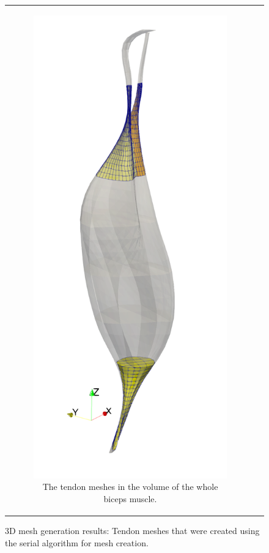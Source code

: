 \begin{figure}
\begin{tabular}{cc}
\begin{subfigure}[b]{0.30\textwidth}
      \includegraphics[width=\textwidth]{images/fiber_creation/muscle_with_tendons.png}
      \caption{The tendon meshes in the volume of the whole biceps muscle.}%
      \label{fig:muscle_with_tendons}%
    \end{subfigure}
  \end{tabular}
  \caption{3D mesh generation results: Tendon meshes that were created using the serial algorithm for mesh creation.}%
  \label{fig:tendon_meshes}%
\end{figure}%

